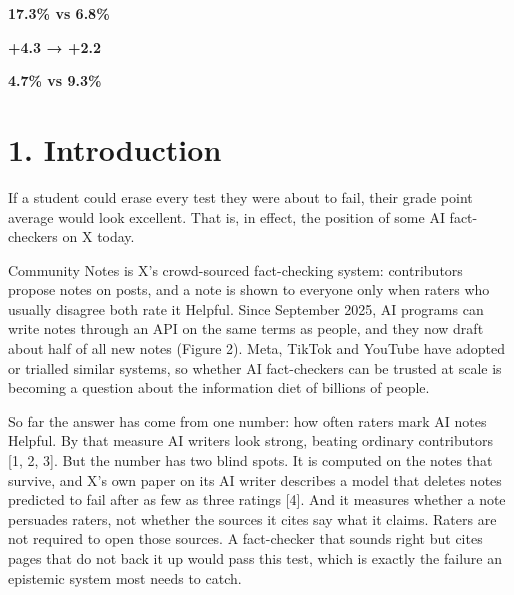 \documentclass[10.5pt]{article}
\begin{document}
\begin{tcbraster}[raster columns=3,raster equal height,raster column skip=6pt]\begin{tcolorbox}[colback=white,colframe=accent!60,boxrule=0.5pt,arc=2pt,halign=center,top=4pt,bottom=4pt]{\sffamily\bfseries\Large\color{accent} 17.3\% vs 6.8\%}\par\vspace{1pt}{\footnotesize of notes deleted by AI vs human writers}\end{tcolorbox}\begin{tcolorbox}[colback=white,colframe=accent!60,boxrule=0.5pt,arc=2pt,halign=center,top=4pt,bottom=4pt]{\sffamily\bfseries\Large\color{accent} +4.3 → +2.2}\par\vspace{1pt}{\footnotesize AI advantage in reaching Helpful, before and after counting deletions (points)}\end{tcolorbox}\begin{tcolorbox}[colback=white,colframe=accent!60,boxrule=0.5pt,arc=2pt,halign=center,top=4pt,bottom=4pt]{\sffamily\bfseries\Large\color{accent} 4.7\% vs 9.3\%}\par\vspace{1pt}{\footnotesize of AI vs human Helpful notes with an unsupporting source}\end{tcolorbox}\end{tcbraster}
\section*{1. Introduction}
If a student could erase every test they were about to fail, their grade point average would look excellent. That is, in effect, the position of some AI fact-checkers on X today.

Community Notes is X's crowd-sourced fact-checking system: contributors propose notes on posts, and a note is shown to everyone only when raters who usually disagree both rate it Helpful. Since September 2025, AI programs can write notes through an API on the same terms as people, and they now draft about half of all new notes (Figure 2). Meta, TikTok and YouTube have adopted or trialled similar systems, so whether AI fact-checkers can be trusted at scale is becoming a question about the information diet of billions of people.

So far the answer has come from one number: how often raters mark AI notes Helpful. By that measure AI writers look strong, beating ordinary contributors [1, 2, 3]. But the number has two blind spots. It is computed on the notes that survive, and X's own paper on its AI writer describes a model that deletes notes predicted to fail after as few as three ratings [4]. And it measures whether a note persuades raters, not whether the sources it cites say what it claims. Raters are not required to open those sources. A fact-checker that sounds right but cites pages that do not back it up would pass this test, which is exactly the failure an epistemic system most needs to catch.
\end{document}
